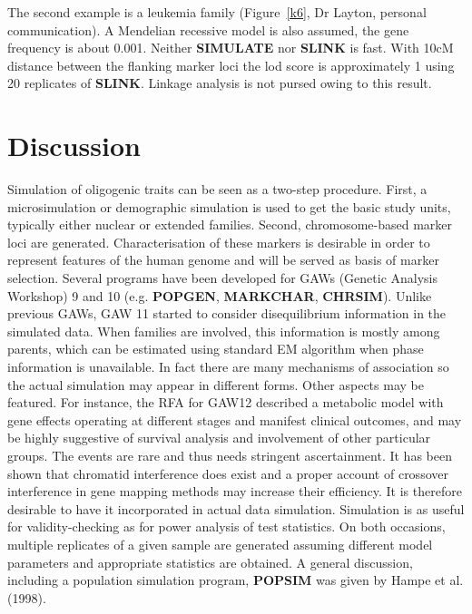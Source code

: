 The second example is a leukemia family (Figure~\ref{k6}, Dr Layton, personal
communication).  A Mendelian recessive model is also assumed, the gene
frequency is about 0.001.  Neither {\bf SIMULATE} nor {\bf SLINK} is fast.
With 10cM distance between the flanking marker loci the lod score is
approximately 1 using 20 replicates of {\bf SLINK}. Linkage analysis is not
pursed owing to this result.



\section{Discussion}

Simulation of oligogenic traits can be seen as a two-step procedure.  First, a
microsimulation or demographic simulation is used to get the basic study units,
typically either nuclear or extended families.  Second, chromosome-based marker
loci are generated.  Characterisation of these markers is desirable in order to
represent features of the human genome and will be served as basis of marker
selection.  Several programs have been developed for GAWs (Genetic Analysis
Workshop) 9 and 10 (e.g.  {\bf POPGEN}, {\bf MARKCHAR}, {\bf CHRSIM}).  Unlike
previous GAWs, GAW 11 started to consider disequilibrium information in the
simulated data.  When families are involved, this information is mostly among
parents, which can be estimated using standard EM algorithm when phase
information is unavailable.  In fact there are many mechanisms of association
so the actual simulation may appear in different forms.  Other aspects may be
featured.  For instance, the RFA for GAW12 described a metabolic model with
gene effects operating at different stages and manifest clinical outcomes, and
may be highly suggestive of survival analysis and involvement of other
particular groups.  The events are rare and thus needs stringent ascertainment.
It has been shown that chromatid interference does exist and a proper account
of crossover interference in gene mapping methods may increase their
efficiency.  It is therefore desirable to have it incorporated in actual data
simulation.  Simulation is as useful for validity-checking as for power
analysis of test statistics.  On both occasions, multiple replicates of a given
sample are generated assuming different model parameters and appropriate
statistics are obtained. A general discussion, including a population
simulation program, {\bf POPSIM} was given by Hampe et al. (1998).


